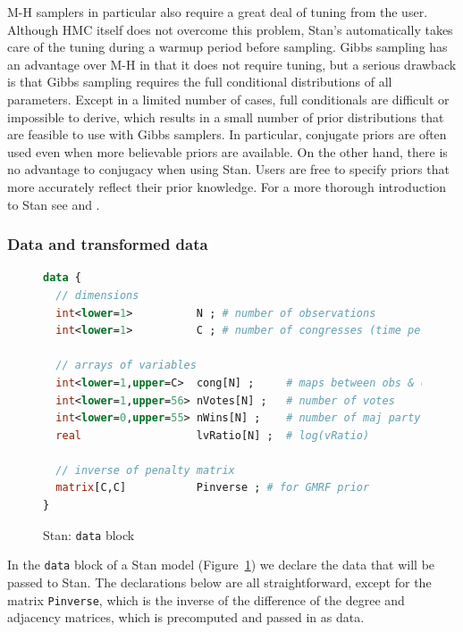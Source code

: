 M-H samplers in particular also require a great deal of tuning from the user. Although HMC itself does not overcome this problem, Stan's automatically takes care of the tuning during a warmup period before sampling. Gibbs sampling has an advantage over M-H in that it does not require tuning, but a serious drawback is that Gibbs sampling requires the full conditional distributions of all parameters. Except in a limited number of cases, full conditionals are difficult or impossible to derive, which results in a small number of prior distributions that are feasible to use with Gibbs samplers. In particular, conjugate priors are often used even when more believable priors are available. On the other hand, there is no advantage to conjugacy when using Stan. Users are free to specify priors that more accurately reflect their prior knowledge. For a more thorough introduction to Stan see  and .

\subsubsection{Data and transformed data}

\begin{figure}[h]
\begin{lstlisting}[language=Stan, frame=trBL]
data {
  // dimensions 
  int<lower=1>          N ; # number of observations 
  int<lower=1>          C ; # number of congresses (time periods)
  
  // arrays of variables 
  int<lower=1,upper=C>  cong[N] ;     # maps between obs & congress
  int<lower=1,upper=56> nVotes[N] ;   # number of votes
  int<lower=0,upper=55> nWins[N] ;    # number of maj party victories
  real                  lvRatio[N] ;  # log(vRatio)
  
  // inverse of penalty matrix 
  matrix[C,C]           Pinverse ; # for GMRF prior
}
\end{lstlisting}
\caption{Stan: {\tt data} block}
\label{stan_data}
\end{figure}

In the {\tt data} block of a Stan model (Figure~\ref{stan_data}) we declare the data that will be passed to Stan. The declarations below are all straightforward, except for the matrix {\tt Pinverse}, which is the inverse of the difference of the degree and adjacency matrices, which is precomputed and passed in as data. 

